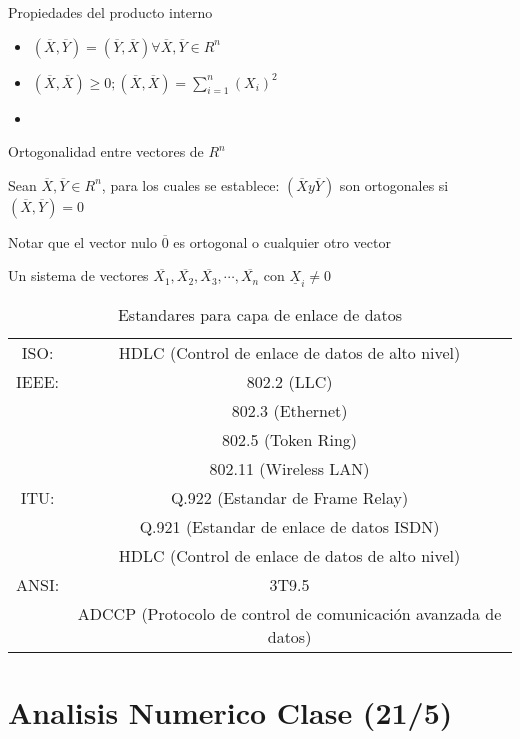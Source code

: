 \documentclass[12pt]{article}
\begin{document}
Propiedades del producto interno
\begin{itemize}
\item
{\large $(\overline{X},\overline{Y})=(\overline{Y},\overline{X})  \forall \overline{X}, \overline{Y} \in R^n$}
\item
{\large $(\overline{X},\overline{X}) \ge 0 ; (\overline{X},\overline{X})= \sum_{i=1}^{n}{(X_i)^2}$}
\item

\end{itemize}

Ortogonalidad entre vectores de {\large $R^n$} 

Sean {\large $\overline{X}, \overline{Y} \in R^n$}, para los cuales se establece: $(\overline{X} y \overline{Y})$ son ortogonales si $(\overline{X},\overline{Y})=0$

Notar que el vector nulo $\overline{0}$ es ortogonal o cualquier otro vector

Un sistema de vectores $ \overline{X_1},\overline{X_2},\overline{X_3},\cdots,\overline{X_n}$ con $\underline{X}_i \ne 0$

\newpage

\begin{table}[!th]
\begin{center}
\begin{tabular}{|c|c|}
\hline
ISO: & HDLC (Control de enlace de datos de alto nivel) \\
IEEE: & 802.2 (LLC) \\
  & 802.3 (Ethernet) \\
  &	802.5 (Token Ring) \\
  & 802.11 (Wireless LAN) \\
ITU: & Q.922 (Estandar de Frame Relay)\\
  & Q.921 (Estandar de enlace de datos ISDN)\\
  & HDLC (Control de enlace de datos de alto nivel) \\
ANSI: & 3T9.5 \\
  & ADCCP (Protocolo de control de comunicación avanzada de datos) \\
\hline
\end{tabular}
\end{center}
\caption{Estandares para capa de enlace de datos}
\label{ex:tablon}
\end{table}

\newpage
\section*{Analisis Numerico Clase (21/5)}
\end{document}
